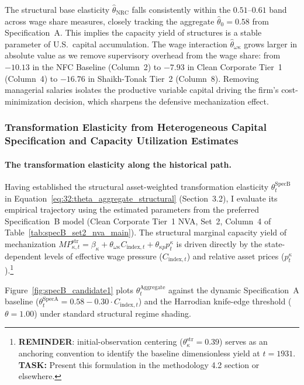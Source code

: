 The structural base elasticity $\hat{\theta}_{\text{NRC}}$ falls consistently within the $0.51$--$0.61$ band across wage share measures, closely tracking the aggregate $\hat{\theta}_0 = 0.58$ from Specification~A. This implies the capacity yield of structures is a stable parameter of U.S.\ capital accumulation. The wage interaction $\hat{\theta}_{\omega\kappa}$ grows larger in absolute value as we remove supervisory overhead from the wage share: from $-10.13$ in the NFC Baseline (Column~2) to $-7.93$ in Clean Corporate Tier~1 (Column~4) to $-16.76$ in Shaikh-Tonak Tier~2 (Column~8). Removing managerial salaries isolates the productive variable capital driving the firm's cost-minimization decision, which sharpens the defensive mechanization effect.




\subsubsection{Transformation Elasticity from Heterogeneous Capital Specification and Capacity Utilization Estimates}

\paragraph{The transformation elasticity along the historical path.}
Having established the structural asset-weighted transformation elasticity $\theta^{\text{SpecB}}_t$ in Equation~\eqref{eq:32:theta_aggregate_structural} (Section~3.2), I evaluate its empirical trajectory using the estimated parameters from the preferred Specification~B model (Clean Corporate Tier~1 NVA, Set~2, Column~4 of Table~\ref{tab:specB_set2_nva_main}). The structural marginal capacity yield of mechanization $MP_{\kappa,t}^{\text{str}} = \beta_\kappa + \theta_{\omega\kappa} C_{\text{index},t} + \theta_{\kappa p} p^\kappa_t$ is driven directly by the state-dependent levels of effective wage pressure ($C_{\text{index},t}$) and relative asset prices ($p^\kappa_t$).\footnote{\textbf{REMINDER}: initial-observation centering ($\theta_\kappa^{\text{str}} = 0.39$) serves as an anchoring convention to identify the baseline dimensionless yield at $t=1931$. \textbf{TASK:} Present this formulation in the methodology 4.2 section or elsewhere.} 

Figure~\ref{fig:specB_candidate1} plots $\theta^{\text{Aggregate}}_t$ against the dynamic Specification~A baseline ($\theta^{\text{SpecA}}_t = 0.58 - 0.30 \cdot C_{\text{index},t}$) and the Harrodian knife-edge threshold ($\theta = 1.00$) under standard structural regime shading.

